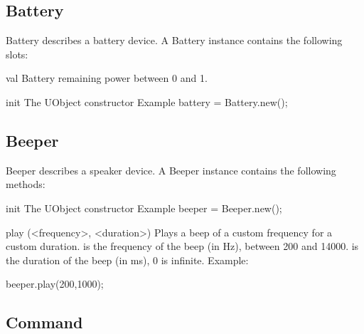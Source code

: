 \subsection{Battery}

Battery describes a battery device. A Battery instance contains the
following slots:
\begin{urbiscriptapi}
\item[val] Battery remaining power between 0 and 1.
\item[init] The UObject constructor Example battery = Battery.new();
\end{urbiscriptapi}

\subsection{Beeper}

Beeper describes a speaker device. A Beeper instance contains the following
methods:

\begin{urbiscriptapi}
\item[init] The UObject constructor Example beeper = Beeper.new();
\item[play](<frequency>, <duration>) Plays a beep of a custom frequency for
  a custom duration.   is the frequency of the beep (in Hz),
  between 200 and 14000.   is the duration of the beep (in
  ms), 0 is infinite.  Example:
\begin{urbiunchecked}
beeper.play(200,1000);
\end{urbiunchecked}
\end{urbiscriptapi}

\subsection{Command}

